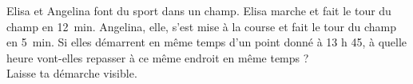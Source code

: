 %
%
    Elisa et Angelina font du sport dans un champ. Elisa marche et fait le tour du champ en \SI{12}{min}. Angelina, elle, s’est mise à la course et fait le tour du champ en \SI{5}{min}. Si elles démarrent en même temps d’un point donné à 13 h 45, à quelle heure vont-elles repasser à ce même endroit en même temps ?\\
    Laisse ta démarche visible.
